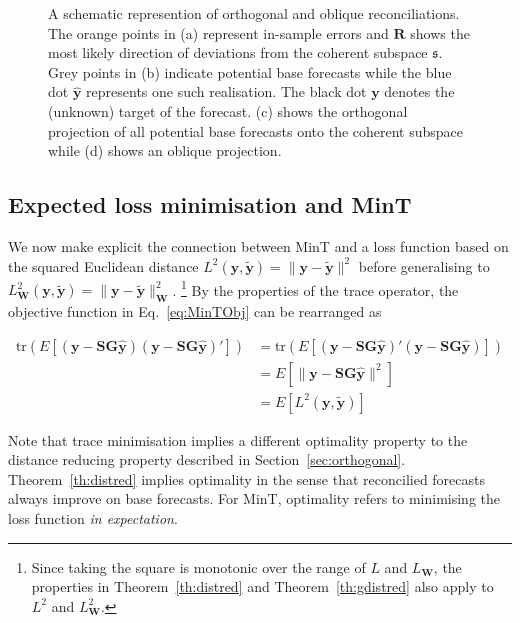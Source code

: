 \documentclass[12pt]{article}
\theoremstyle{definition}
\begin{document}
\begin{figure}[!p]
\begin{subfigure}[!h]{0.415\textwidth}
      \caption{}
  \end{subfigure}
  \caption{A schematic represention of orthogonal and oblique reconciliations. The orange points in (a) represent in-sample errors and $\bm{R}$ shows the most likely direction of deviations from the coherent subspace $\mathfrak{s}$. Grey points in (b) indicate potential base forecasts while the blue dot ${\hat{\bm y}}$ represents one such realisation. The black dot ${\bm y}$ denotes the (unknown) target of the forecast. (c) shows the orthogonal projection of all potential base forecasts onto the coherent subspace while (d) shows an oblique projection.}\label{fig:OthogonalVSOblique_projection}
\end{figure}

{\color{blue}

\subsection{Expected loss minimisation and MinT}

We now make explicit the connection between MinT and a loss function based on the squared Euclidean distance $L^2(\bm{y},\tilde{\bm{y}})=\|\bm{y}-\tilde{\bm{y}}\|^2$ before generalising to $L^2_{\bm W}(\bm{y},\tilde{\bm{y}})=\|\bm{y}-\tilde{\bm{y}}\|^2_{\bm W}$.  \footnote{Since taking the square is monotonic over the range of $L$ and $L_{\bm W}$, the properties in Theorem~\ref{th:distred} and Theorem~\ref{th:gdistred} also apply to $L^2$ and $L^2_{\bm W}$.}  By the properties of the trace operator, the objective function in Eq.~\eqref{eq:MinTObj} can be rearranged as

\begin{align*}
\label{eq:MinTObj}
\textrm{tr}(E\left[(\bm{y}-{\bm S}{\bm G}\hat{\bm{y}})(\bm{y}-{\bm S}{\bm G}\hat{\bm{y}})'\right])&=\textrm{tr}(E\left[(\bm{y}-{\bm S}{\bm G}\hat{\bm{y}})'(\bm{y}-{\bm S}{\bm G}\hat{\bm{y}})\right])\\
&=E\left[\|\bm{y}-{\bm S}{\bm G}\hat{\bm{y}}\|^2\right]\\
&=E\left[L^2(\bm{y},\tilde{\bm{y}})\right]
\end{align*}

Note that trace minimisation implies a different optimality property to the distance reducing property described in Section~\ref{sec:orthogonal}.  Theorem~\ref{th:distred} implies optimality in the sense that reconcilied forecasts always improve on base forecasts.  For MinT, optimality refers to minimising the loss function \textit{in expectation}.

}
\end{document}
